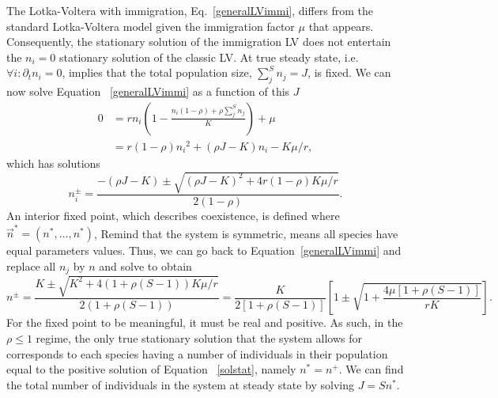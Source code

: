 \documentclass[%
 amsmath,amssymb,
 reprint,%
]{revtex4-2}
\begin{document}
\begin{widetext}
The Lotka-Voltera with immigration, Eq.~\eqref{generalLVimmi}, differs from the standard Lotka-Voltera model given the immigration factor $\mu$ that appears.
Consequently, the stationary solution of the immigration LV does not entertain the $n_i=0$ stationary solution of the classic LV.
At true steady state, i.e.  $\forall i: \partial_t n_i=0$,  implies that the total population size, $\sum_j^S n_j=J$, is fixed.
We can now solve Equation ~\ref{generalLVimmi} as a function of this $J$
\begin{align}
0 &= r n_i\left( 1 - \frac{n_i(1-\rho) + \rho \sum_{j}^S n_j}{K} \right) + \mu \\ \nonumber
&= r( 1 - \rho ){n_i}^2 + (\rho J -K)n_i - K \mu / r,
\end{align} 
which has solutions
\begin{equation}
n_i^\pm = \frac{-(\rho J - K) \pm \sqrt{(\rho J - K)^2 + 4r(1-\rho)K \mu / r }}{2(1-\rho )}.
\end{equation}
An interior fixed point, which describes coexistence, is defined where $\vec{n}^*=(n^*,\dots,n^*)$, Remind that the system is symmetric, means all species have equal parameters values. Thus, we can go back to Equation~\eqref{generalLVimmi} and replace all $n_j$ by $n$ and solve to obtain
\begin{equation}\label{solstat}
n^{\pm} = \frac{K \pm \sqrt{K^2 + 4(1 + \rho (S-1) )K \mu / r }}{2(1 + \rho (S-1) )}=\frac{K}{2[1+\rho(S-1)]}\left[1\pm \sqrt{1+\frac{4\mu[1+\rho(S-1)]}{r K}}\right].
\end{equation}
For the fixed point to be meaningful, it must be real and positive.
As such, in the $\rho \leq 1$ regime, the only true stationary solution that the system allows  for corresponds to each species having a number of individuals in their population equal to the positive solution of Equation ~\eqref{solstat}, namely $n^*=n^+$.
We can find the total number of individuals in the system at steady state by solving $J=S n^*$.


\end{widetext}
\end{document}
